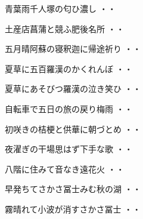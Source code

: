 \vspace{0.6cm}
\begin{shiika}青葉雨千人塚の匂ひ濃し
\hfill{・・}\end{shiika}
\vspace{0.6cm}
\begin{shiika}土産店菖蒲と競ふ肥後名所
\hfill{・・}\end{shiika}
\vspace{0.6cm}
\begin{shiika}五月晴阿蘇の寝釈迦に帰途祈り
\hfill{・・}\end{shiika}
\vspace{0.6cm}
\begin{shiika}夏草に五百羅漢のかくれんぼ
\hfill{・・}\end{shiika}
\vspace{0.6cm}
\begin{shiika}夏草にあそびつ羅漢の泣き笑ひ
\hfill{・・}\end{shiika}
\vspace{0.6cm}
\begin{shiika}自転車で五日の旅の戻り梅雨
\hfill{・・}\end{shiika}
\vspace{0.6cm}
\begin{shiika}初咲きの桔梗と供華に朝づとめ
\hfill{・・}\end{shiika}
\vspace{0.6cm}
\begin{shiika}夜濯ぎの干場思はず下手な歌
\hfill{・・}\end{shiika}
\vspace{0.6cm}
\begin{shiika}八階に住みて音なき遠花火
\hfill{・・}\end{shiika}
\vspace{0.6cm}
\begin{shiika}早発ちてさかさ冨士みむ秋の湖
\hfill{・・}\end{shiika}
\vspace{0.6cm}
\begin{shiika}霧晴れて小波が消すさかさ冨士
\hfill{・・}\end{shiika}
